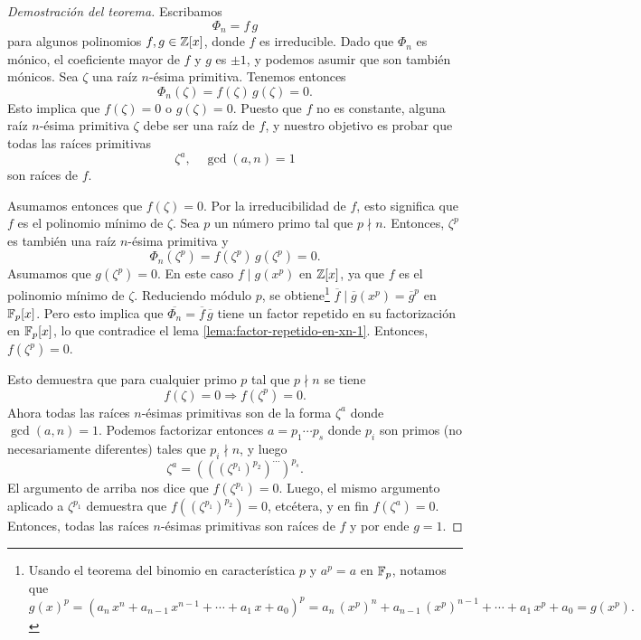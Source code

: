 \begin{proof}[Demostración del teorema]
  Escribamos
  $$\Phi_n = f\,g$$
  para algunos polinomios $f,g\in \mathbb{Z}[x]$, donde $f$ es irreducible. Dado que
  $\Phi_n$ es mónico, el coeficiente mayor de $f$ y $g$ es $\pm 1$, y podemos
  asumir que son también mónicos. Sea $\zeta$ una raíz $n$-ésima
  primitiva. Tenemos entonces
  $$\Phi_n (\zeta) = f (\zeta)\,g (\zeta) = 0.$$
  Esto implica que $f (\zeta) = 0$ o $g (\zeta) = 0$. Puesto que $f$ no es
  constante, alguna raíz $n$-ésima primitiva $\zeta$ debe ser una raíz de $f$, y
  nuestro objetivo es probar que todas las raíces primitivas
  $$\zeta^a, \quad \gcd (a,n) = 1$$
  son raíces de $f$.

  \vspace{1em}

  Asumamos entonces que $f (\zeta) = 0$. Por la irreducibilidad de $f$, esto
  significa que $f$ es el polinomio mínimo de $\zeta$. Sea $p$ un número primo
  tal que $p \nmid n$. Entonces, $\zeta^p$ es también una raíz $n$-ésima
  primitiva y
  $$\Phi_n (\zeta^p) = f (\zeta^p)\,g (\zeta^p) = 0.$$
  Asumamos que $g (\zeta^p) = 0$. En este caso $f \mid g (x^p)$ en $\mathbb{Z} [x]$, ya
  que $f$ es el polinomio mínimo de $\zeta$. Reduciendo módulo $p$, se
  obtiene\footnote{Usando el teorema del binomio en característica $p$ y $a^p =
    a$ en $\mathbb{F}_p$, notamos que
    $$g(x)^p = (a_n\,x^n + a_{n-1}\,x^{n-1} + \cdots + a_1\,x + a_0)^p = a_n\,(x^p)^n + a_{n-1}\,(x^p)^{n-1} + \cdots + a_1\,x^p + a_0 = g (x^p).$$}
  $\overline{f} \mid \overline{g} (x^p) = \overline{g}^p$ en $\mathbb{F}_p [x]$. Pero
  esto implica que $\overline{\Phi_n} = \overline{f}\,\overline{g}$ tiene un
  factor repetido en su factorización en $\mathbb{F}_p [x]$, lo que contradice el lema
  \ref{lema:factor-repetido-en-xn-1}. Entonces, $f (\zeta^p) = 0$.

  Esto demuestra que para cualquier primo $p$ tal que $p\nmid n$ se tiene
  $$f (\zeta) = 0 \Longrightarrow f (\zeta^p) = 0.$$
  Ahora todas las raíces $n$-ésimas primitivas son de la forma $\zeta^a$ donde
  $\gcd (a,n) = 1$. Podemos factorizar entonces $a = p_1\cdots p_s$ donde $p_i$
  son primos (no necesariamente diferentes) tales que $p_i\nmid n$, y luego
  $$\zeta^a = (((\zeta^{p_1})^{p_2})^{\cdots})^{p_s}.$$
  El argumento de arriba nos dice que $f (\zeta^{p_1}) = 0$. Luego, el mismo
  argumento aplicado a $\zeta^{p_1}$ demuestra que
  $f ((\zeta^{p_1})^{p_2}) = 0$, etcétera, y en fin $f (\zeta^a) = 0$. Entonces,
  todas las raíces $n$-ésimas primitivas son raíces de $f$ y por ende $g = 1$.
\end{proof}

